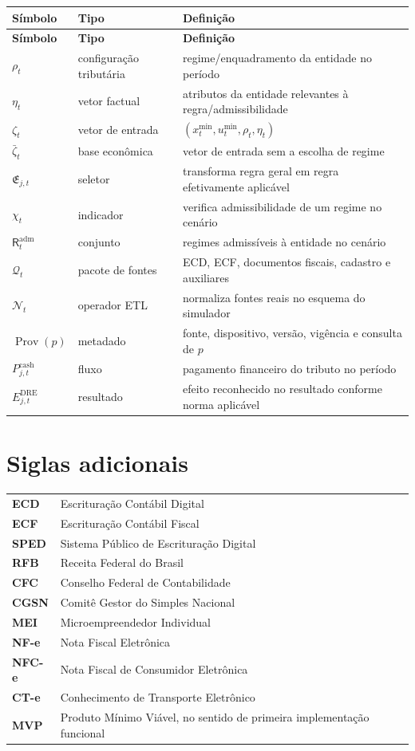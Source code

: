 \documentclass[11pt,a4paper]{article}
\newcommand{\cQ}{\mathcal{Q}}
\newcommand{\cN}{\mathcal{N}}
\newcommand{\Prov}{\operatorname{Prov}}
\begin{document}
\begin{longtable}{p{3.1cm}p{3.0cm}p{7.4cm}}
\toprule
\textbf{Símbolo} & \textbf{Tipo} & \textbf{Definição}\\
\midrule
\endfirsthead
\toprule
\textbf{Símbolo} & \textbf{Tipo} & \textbf{Definição}\\
\midrule
\endhead
$\rho_t$ & configuração tributária & regime/enquadramento da entidade no período\\
$\eta_t$ & vetor factual & atributos da entidade relevantes à regra/admissibilidade\\
$\zeta_t$ & vetor de entrada & $(x_t^{\min},u_t^{\min},\rho_t,\eta_t)$\\
$\bar\zeta_t$ & base econômica & vetor de entrada sem a escolha de regime\\
$\mathfrak E_{j,t}$ & seletor & transforma regra geral em regra efetivamente aplicável\\
$\chi_t$ & indicador & verifica admissibilidade de um regime no cenário\\
$\mathsf R_t^{\mathrm{adm}}$ & conjunto & regimes admissíveis à entidade no cenário\\
$\cQ_t$ & pacote de fontes & ECD, ECF, documentos fiscais, cadastro e auxiliares\\
$\cN_t$ & operador ETL & normaliza fontes reais no esquema do simulador\\
$\Prov(p)$ & metadado & fonte, dispositivo, versão, vigência e consulta de $p$\\
$P_{j,t}^{\mathrm{cash}}$ & fluxo & pagamento financeiro do tributo no período\\
$E_{j,t}^{\mathrm{DRE}}$ & resultado & efeito reconhecido no resultado conforme norma aplicável\\
\bottomrule
\end{longtable}

\section{Siglas adicionais}

\begin{tabularx}{\textwidth}{>{\bfseries}p{2.6cm}X}
\toprule
ECD & Escrituração Contábil Digital\\
ECF & Escrituração Contábil Fiscal\\
SPED & Sistema Público de Escrituração Digital\\
RFB & Receita Federal do Brasil\\
CFC & Conselho Federal de Contabilidade\\
CGSN & Comitê Gestor do Simples Nacional\\
MEI & Microempreendedor Individual\\
NF-e & Nota Fiscal Eletrônica\\
NFC-e & Nota Fiscal de Consumidor Eletrônica\\
CT-e & Conhecimento de Transporte Eletrônico\\
MVP & Produto Mínimo Viável, no sentido de primeira implementação funcional\\
\bottomrule
\end{tabularx}
\end{document}

